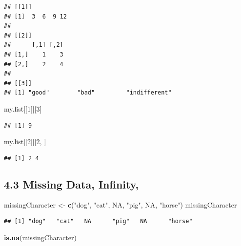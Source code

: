 \documentclass[]{article}
\newenvironment{Shaded}{\begin{snugshade}}{\end{snugshade}}
\newcommand{\KeywordTok}[1]{\textcolor[rgb]{0.13,0.29,0.53}{\textbf{#1}}}
\newcommand{\DecValTok}[1]{\textcolor[rgb]{0.00,0.00,0.81}{#1}}
\newcommand{\StringTok}[1]{\textcolor[rgb]{0.31,0.60,0.02}{#1}}
\newcommand{\OtherTok}[1]{\textcolor[rgb]{0.56,0.35,0.01}{#1}}
\newcommand{\NormalTok}[1]{#1}
\begin{document}
\begin{verbatim}
## [[1]]
## [1]  3  6  9 12
## 
## [[2]]
##      [,1] [,2]
## [1,]    1    3
## [2,]    2    4
## 
## [[3]]
## [1] "good"        "bad"         "indifferent"
\end{verbatim}

\begin{Shaded}
\begin{Highlighting}[]
\NormalTok{ my.list[[}\DecValTok{1}\NormalTok{]][}\DecValTok{3}\NormalTok{]}
\end{Highlighting}
\end{Shaded}

\begin{verbatim}
## [1] 9
\end{verbatim}

\begin{Shaded}
\begin{Highlighting}[]
\NormalTok{  my.list[[}\DecValTok{2}\NormalTok{]][}\DecValTok{2}\NormalTok{, ]}
\end{Highlighting}
\end{Shaded}

\begin{verbatim}
## [1] 2 4
\end{verbatim}

\subsection{4.3 Missing Data, Infinity,}\label{missing-data-infinity}

\begin{Shaded}
\begin{Highlighting}[]
\NormalTok{missingCharacter <-}\StringTok{ }\KeywordTok{c}\NormalTok{(}\StringTok{"dog"}\NormalTok{, }\StringTok{"cat"}\NormalTok{, }\OtherTok{NA}\NormalTok{, }\StringTok{"pig"}\NormalTok{, }\OtherTok{NA}\NormalTok{, }\StringTok{"horse"}\NormalTok{)}
\NormalTok{missingCharacter}
\end{Highlighting}
\end{Shaded}

\begin{verbatim}
## [1] "dog"   "cat"   NA      "pig"   NA      "horse"
\end{verbatim}

\begin{Shaded}
\begin{Highlighting}[]
\KeywordTok{is.na}\NormalTok{(missingCharacter)}
\end{Highlighting}
\end{Shaded}
\end{document}
